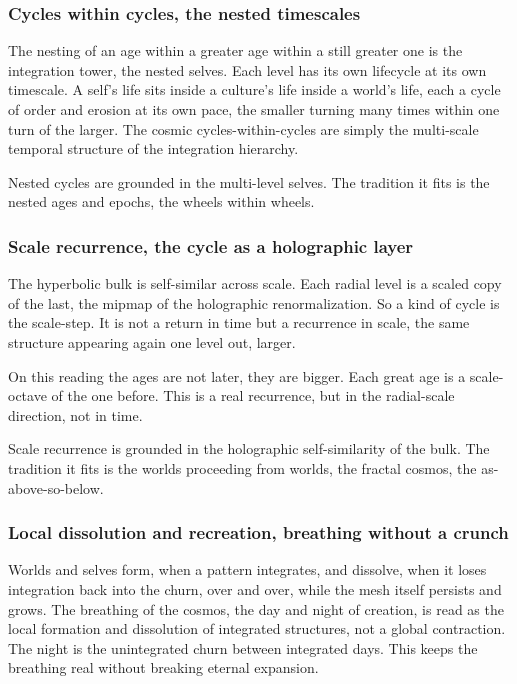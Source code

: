 \subsubsection{Cycles within cycles, the nested timescales}

The nesting of an age within a greater age within a still greater one is the integration tower, the nested selves. Each level has its own lifecycle at its own timescale. A self's life sits inside a culture's life inside a world's life, each a cycle of order and erosion at its own pace, the smaller turning many times within one turn of the larger. The cosmic cycles-within-cycles are simply the multi-scale temporal structure of the integration hierarchy.

\begin{result}
Nested cycles are grounded in the multi-level selves. The tradition it fits is the nested ages and epochs, the wheels within wheels.
\end{result}

\subsubsection{Scale recurrence, the cycle as a holographic layer}

The hyperbolic bulk is self-similar across scale. Each radial level is a scaled copy of the last, the mipmap of the holographic renormalization. So a kind of cycle is the scale-step. It is not a return in time but a recurrence in scale, the same structure appearing again one level out, larger.

On this reading the ages are not later, they are bigger. Each great age is a scale-octave of the one before. This is a real recurrence, but in the radial-scale direction, not in time.

\begin{result}
Scale recurrence is grounded in the holographic self-similarity of the bulk. The tradition it fits is the worlds proceeding from worlds, the fractal cosmos, the as-above-so-below.
\end{result}

\subsubsection{Local dissolution and recreation, breathing without a crunch}

Worlds and selves form, when a pattern integrates, and dissolve, when it loses integration back into the churn, over and over, while the mesh itself persists and grows. The breathing of the cosmos, the day and night of creation, is read as the local formation and dissolution of integrated structures, not a global contraction. The night is the unintegrated churn between integrated days. This keeps the breathing real without breaking eternal expansion.

